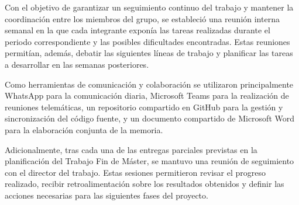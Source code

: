 Con el objetivo de garantizar un seguimiento continuo del trabajo y
mantener la coordinación entre los miembros del grupo, se estableció una
reunión interna semanal en la que cada integrante exponía las tareas
realizadas durante el periodo correspondiente y las posibles
dificultades encontradas. Estas reuniones permitían, además, debatir las
siguientes líneas de trabajo y planificar las tareas a desarrollar en
las semanas posteriores.

Como herramientas de comunicación y colaboración se utilizaron
principalmente WhatsApp para la comunicación diaria, Microsoft Teams
para la realización de reuniones telemáticas, un repositorio compartido
en GitHub para la gestión y sincronización del código fuente, y un
documento compartido de Microsoft Word para la elaboración conjunta de
la memoria.

Adicionalmente, tras cada una de las entregas parciales previstas en la
planificación del Trabajo Fin de Máster, se mantuvo una reunión de
seguimiento con el director del trabajo. Estas sesiones permitieron
revisar el progreso realizado, recibir retroalimentación sobre los
resultados obtenidos y definir las acciones necesarias para las
siguientes fases del proyecto.
